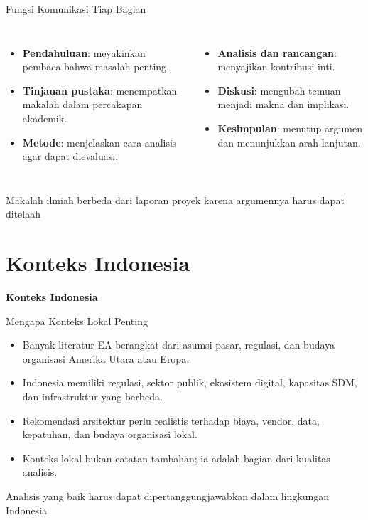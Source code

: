 \documentclass[aspectratio=169, table]{beamer}
\newcommand{\sectionframe}[1]{%
  \begin{frame}{\hfill}
    \centering
    \Huge{\textbf{#1}}
  \end{frame}
}
\newcommand{\takeaway}[1]{%
  \vspace{4pt}
  {\footnotesize #1}
}
\begin{document}
\begin{frame}{Fungsi Komunikasi Tiap Bagian}
  \vspace{8pt}
  \begin{columns}[t]
    \begin{itemize}
      \item \textbf{Pendahuluan}: meyakinkan pembaca bahwa masalah penting.
      \item \textbf{Tinjauan pustaka}: menempatkan makalah dalam percakapan akademik.
      \item \textbf{Metode}: menjelaskan cara analisis agar dapat dievaluasi.
    \end{itemize}

    \begin{itemize}
      \item \textbf{Analisis dan rancangan}: menyajikan kontribusi inti.
      \item \textbf{Diskusi}: mengubah temuan menjadi makna dan implikasi.
      \item \textbf{Kesimpulan}: menutup argumen dan menunjukkan arah lanjutan.
    \end{itemize}
  \end{columns}

  \takeaway{Makalah ilmiah berbeda dari laporan proyek karena argumennya harus dapat ditelaah}
\end{frame}

\section{Konteks Indonesia}
\sectionframe{Konteks Indonesia}

\begin{frame}{Mengapa Konteks Lokal Penting}
  \vspace{10pt}
  \begin{itemize}
    \item Banyak literatur EA berangkat dari asumsi pasar, regulasi, dan budaya organisasi Amerika Utara atau Eropa.
    \item Indonesia memiliki regulasi, sektor publik, ekosistem digital, kapasitas SDM, dan infrastruktur yang berbeda.
    \item Rekomendasi arsitektur perlu realistis terhadap biaya, vendor, data, kepatuhan, dan budaya organisasi lokal.
    \item Konteks lokal bukan catatan tambahan; ia adalah bagian dari kualitas analisis.
  \end{itemize}

  \takeaway{Analisis yang baik harus dapat dipertanggungjawabkan dalam lingkungan Indonesia}
\end{frame}
\end{document}
